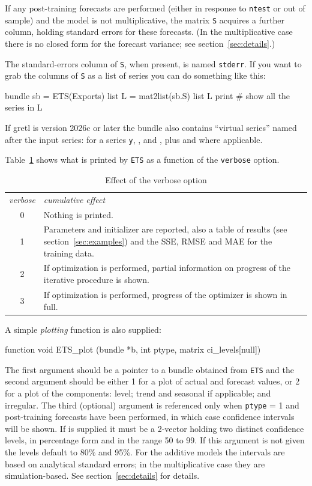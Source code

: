 \documentclass{article}
\begin{document}
If any post-training forecasts are performed (either in response to
\texttt{ntest} or out of sample) and the model is not multiplicative,
the matrix \texttt{S} acquires a further column, holding standard errors
for these forecasts. (In the multiplicative case there is no closed
form for the forecast variance; see section~\ref{sec:details}.)

The standard-errors column of \texttt{S}, when present, is named
\texttt{stderr}. If you want to grab the columns of \texttt{S} as a list
of series you can do something like this:
\begin{nscode}
bundle sb = ETS(Exports)
list L = mat2list(sb.S)
list L print # show all the series in L
\end{nscode}
If gretl is version 2026c or later the bundle also contains ``virtual
series'' named after the input series: for a series \texttt{y},
,  and , plus  and
 where applicable.

Table~\ref{tab:verbose} shows what is printed by \texttt{ETS} as a
function of the \texttt{verbose} option.

\begin{table}[htbp]
  \caption{Effect of the verbose option}
  \label{tab:verbose}
  \begin{tabular}{cp{4.5in}}
    \textit{verbose} & \textit{cumulative effect} \\[6pt]
    0 & Nothing is printed. \\
    1 & Parameters and initializer are reported, also a table
        of results (see section~\ref{sec:examples}) and the SSE,
        RMSE and MAE for the training data.\\
    2 & If optimization is performed, partial information on
        progress of the iterative procedure is shown. \\
    3 & If optimization is performed, progress of the
        optimizer is shown in full.
  \end{tabular}
\end{table}

A simple \textit{plotting} function is also supplied:
\begin{nscode}
function void ETS_plot (bundle *b, int ptype, matrix ci_levels[null])
\end{nscode}
The first argument should be a pointer to a bundle obtained from
\texttt{ETS} and the second argument should be either 1 for a plot of
actual and forecast values, or 2 for a plot of the components: level;
trend and seasonal if applicable; and irregular. The third (optional)
argument is referenced only when \texttt{ptype} = 1 and post-training
forecasts have been performed, in which case confidence intervals will be
shown. If  is supplied it must be a 2-vector holding two
distinct confidence levels, in percentage form and in the range 50 to
99. If this argument is not given the levels default to 80\% and 95\%.
For the additive models the intervals are based on analytical standard
errors; in the multiplicative case they are simulation-based. See
section~\ref{sec:details} for details.
\end{document}
